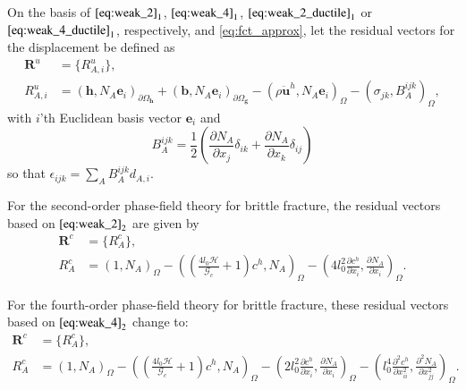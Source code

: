 On the basis of $\eqref{eq:weak_2}_{1}$, $\eqref{eq:weak_4}_{1}$, $\eqref{eq:weak_2_ductile}_{1}$ or $\eqref{eq:weak_4_ductile}_{1}$, respectively, and \eqref{eq:fct_approx}, let the residual vectors for the displacement be defined as
\begin{equation} \label{eq:res_vecs_u}
	\begin{aligned}
		\mathbf{R}^{u}&=\{R_{A,i}^{u}\}, \\
		R_{A,i}^{u} &= \left(\mathbf{h},N_{A}\mathbf{e}_{i}\right)_{\partial\Omega_{\mathbf{h}}} + \left(\mathbf{b},N_{A}\mathbf{e}_{i}\right)_{\partial\Omega_{\mathbf{g}}} - \left(\rho\ddot{\mathbf{u}}^{h},N_{A}\mathbf{e}_{i}\right)_{\Omega}-\left(\sigma_{jk},B_{A}^{ijk}\right)_{\Omega},
	\end{aligned}
\end{equation}
with $i$'th Euclidean basis vector $\mathbf{e}_{i}$ and
\begin{equation}
	B_{A}^{ijk}=\frac{1}{2}\left(\frac{\partial N_{A}}{\partial x_{j}}\delta_{ik}+\frac{\partial N_{A}}{\partial x_{k}}\delta_{ij}\right)
\end{equation}
so that $\epsilon_{ijk}=\sum_{A}B_{A}^{ijk}d_{A,i}$.

For the second-order phase-field theory for brittle fracture, the residual vectors based on $\eqref{eq:weak_2}_{2}$ are given by
\begin{equation} \label{eq:res_vecs_c2}
	\begin{aligned}
		\mathbf{R}^{c}&=\{R_{A}^{c}\}, \\
		R_{A}^{c} &= \left(1,N_{A}\right)_{\Omega} - \left(\left(\frac{4l_{0}\mathcal{H}}{\mathcal{G}_{c}}+1\right)c^{h},N_{A}\right)_{\Omega} - \left(4l_{0}^{2}\frac{\partial c^{h}}{\partial x_{i}},\frac{\partial N_{A}}{\partial x_{i}}\right)_{\Omega}.
	\end{aligned}
\end{equation}

For the fourth-order phase-field theory for brittle fracture, these residual vectors based on $\eqref{eq:weak_4}_{2}$ change to:
\begin{equation} \label{eq:res_vecs_c4}
	\begin{aligned}
		\mathbf{R}^{c}&=\{R_{A}^{c}\}, \\
		R_{A}^{c} &= \left(1,N_{A}\right)_{\Omega} - \left(\left(\frac{4l_{0}\mathcal{H}}{\mathcal{G}_{c}}+1\right)c^{h},N_{A}\right)_{\Omega} - \left(2l_{0}^{2}\frac{\partial c^{h}}{\partial x_{i}},\frac{\partial N_{A}}{\partial x_{i}}\right)_{\Omega} - \left(l_{0}^{4}\frac{\partial^{2}c^{h}}{\partial x_{ii}^{2}},\frac{\partial^{2}N_{A}}{\partial x_{jj}^{2}}\right)_{\Omega}.
	\end{aligned}
\end{equation}

